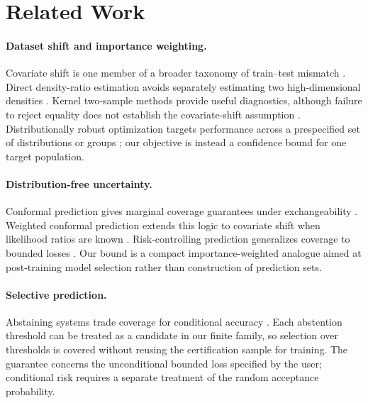 \section{Related Work}
\label{sec:related}

\paragraph{Dataset shift and importance weighting.}
Covariate shift is one member of a broader taxonomy of train--test mismatch
\citep{quionero2009dataset}.  Direct density-ratio estimation avoids separately
estimating two high-dimensional densities \citep{sugiyama2007direct}.  Kernel
two-sample methods provide useful diagnostics, although failure to reject equality
does not establish the covariate-shift assumption \citep{gretton2012kernel}.
Distributionally robust optimization targets performance across a prespecified set
of distributions or groups \citep{sagawa2020distributionally}; our objective is
instead a confidence bound for one target population.

\paragraph{Distribution-free uncertainty.}
Conformal prediction gives marginal coverage guarantees under exchangeability
\citep{vovk2005algorithmic,lei2018distribution}.  Weighted conformal prediction
extends this logic to covariate shift when likelihood ratios are known
\citep{tibshirani2019conformal}.  Risk-controlling prediction generalizes coverage
to bounded losses \citep{angelopoulos2024risk}.  Our bound is a compact
importance-weighted analogue aimed at post-training model selection rather than
construction of prediction sets.

\paragraph{Selective prediction.}
Abstaining systems trade coverage for conditional accuracy
\citep{geifman2017selective}.  Each abstention threshold can be treated as a
candidate in our finite family, so selection over thresholds is covered without
reusing the certification sample for training.  The guarantee concerns the
unconditional bounded loss specified by the user; conditional risk requires a
separate treatment of the random acceptance probability.
